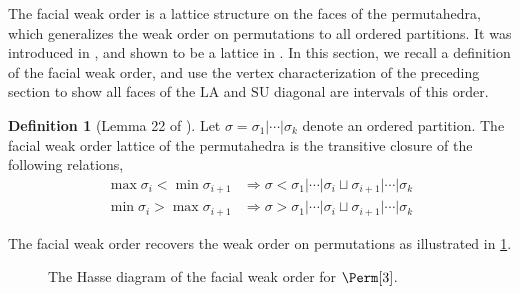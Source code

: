 \documentclass{amsart}
\theoremstyle{definition}
\newtheorem{definition}[theorem]{Definition}
\renewcommand{\implies}{\Rightarrow} %
\newcommand{\SU}{\mathrm{SU}}
\newcommand{\LA}{\mathrm{LA}}
\begin{document}
The facial weak order is a lattice structure on the faces of the permutahedra, which generalizes the weak order on permutations to all ordered partitions.
It was introduced in \cite{palacios2004weak}, and shown to be a lattice in \cite{dermenjian2018facial}.
In this section, we recall a definition of the facial weak order, and use the vertex characterization of the preceding section to show all faces of the  $\LA$ and $\SU$ diagonal are intervals of this order.

\begin{definition}[Lemma 22 of \cite{palacios2004weak}]
Let $\sigma = \sigma_1|\cdots|\sigma_k$ denote an ordered partition.
The facial weak order lattice of the permutahedra is the transitive closure of the following relations,
\begin{align}
    \max \sigma_i < \min \sigma_{i+1} &\implies \sigma < \sigma_1|\cdots|\sigma_i \sqcup \sigma_{i+1}|\cdots|\sigma_k  \label{eq:facial weak 1}\\
    \min \sigma_i > \max \sigma_{i+1} &\implies \sigma > \sigma_1|\cdots|\sigma_i \sqcup \sigma_{i+1}|\cdots|\sigma_k \label{eq:facial weak 2}
\end{align}
\end{definition}
The facial weak order recovers the weak order on permutations as illustrated in \cref{fig:Hasse diagram Perm3}.
\begin{figure}
\caption{The Hasse diagram of the facial weak order for $\Perm[3]$.}
\label{fig:Hasse diagram Perm3}
\end{figure}
\end{document}
